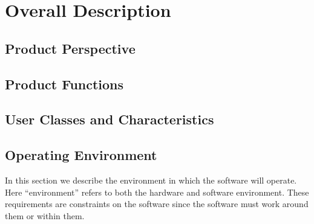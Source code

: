 \chapter{Overall Description}
\section{Product Perspective}

\section{Product Functions}

\section{User Classes and Characteristics}

\section{Operating Environment}
In this section we describe the environment in which the software will
operate. Here ``environment'' refers to both the hardware and software
environment. These requirements are constraints on the software since
the software must work around them or within them.

